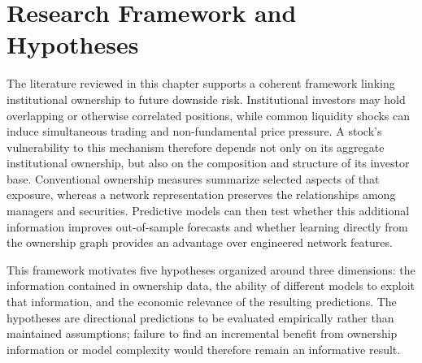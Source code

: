 \section{Research Framework and Hypotheses}
\label{sec:research_framework}

The literature reviewed in this chapter supports a coherent framework linking institutional ownership to future downside risk. Institutional investors may hold overlapping or otherwise correlated positions, while common liquidity shocks can induce simultaneous trading and non-fundamental price pressure. A stock's vulnerability to this mechanism therefore depends not only on its aggregate institutional ownership, but also on the composition and structure of its investor base. Conventional ownership measures summarize selected aspects of that exposure, whereas a network representation preserves the relationships among managers and securities. Predictive models can then test whether this additional information improves out-of-sample forecasts and whether learning directly from the ownership graph provides an advantage over engineered network features.

This framework motivates five hypotheses organized around three dimensions: the information contained in ownership data, the ability of different models to exploit that information, and the economic relevance of the resulting predictions. The hypotheses are directional predictions to be evaluated empirically rather than maintained assumptions; failure to find an incremental benefit from ownership information or model complexity would therefore remain an informative result.

